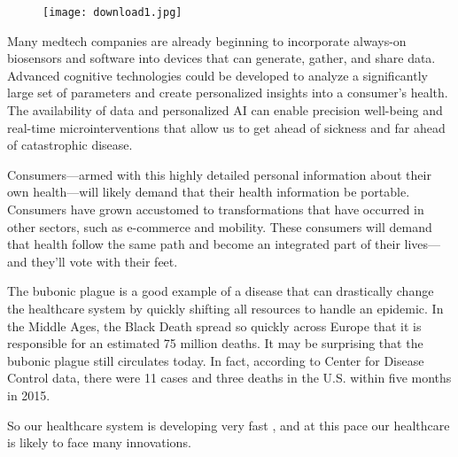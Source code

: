 \documentclass[12pt,a4paper]{report}
\begin{document}
\begin{figure}
    \centering
    \texttt{[image: download1.jpg]}
\end{figure}

Many medtech companies are already beginning to incorporate always-on biosensors and software into devices that can generate, gather, and share data. Advanced cognitive technologies could be developed to analyze a significantly large set of parameters and create personalized insights into a consumer’s health. The availability of data and personalized AI can enable precision well-being and real-time microinterventions that allow us to get ahead of sickness and far ahead of catastrophic disease.\par 

Consumers—armed with this highly detailed personal information about their own health—will likely demand that their health information be portable. Consumers have grown accustomed to transformations that have occurred in other sectors, such as e-commerce and mobility. These consumers will demand that health follow the same path and become an integrated part of their lives—and they’ll vote with their feet.\par 

The bubonic plague is a good example of a disease that can drastically change the healthcare system by quickly shifting all resources to handle an epidemic. In the Middle Ages, the Black Death spread so quickly across Europe that it is responsible for an estimated 75 million deaths. It may be surprising that the bubonic plague still circulates today. In fact, according to Center for Disease Control data, there were 11 cases and three deaths in the U.S. within five months in 2015.\par

So our healthcare system is developing very fast , and at this pace our healthcare is likely to face many innovations.
\end{document}
